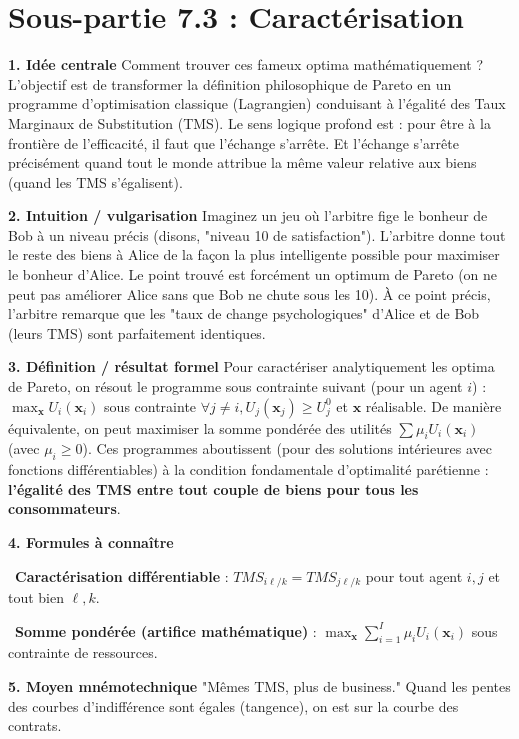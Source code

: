 \documentclass[11pt, a4paper]{report}
\begin{document}
\section{Sous-partie 7.3 : Caractérisation}

\textbf{1. Idée centrale}
Comment trouver ces fameux optima mathématiquement ? L'objectif est de transformer la définition philosophique de Pareto en un programme d'optimisation classique (Lagrangien) conduisant à l'égalité des Taux Marginaux de Substitution (TMS). Le sens logique profond est : pour être à la frontière de l'efficacité, il faut que l'échange s'arrête. Et l'échange s'arrête précisément quand tout le monde attribue la même valeur relative aux biens (quand les TMS s'égalisent).

\textbf{2. Intuition / vulgarisation}
Imaginez un jeu où l'arbitre fige le bonheur de Bob à un niveau précis (disons, "niveau 10 de satisfaction"). L'arbitre donne tout le reste des biens à Alice de la façon la plus intelligente possible pour maximiser le bonheur d'Alice. Le point trouvé est forcément un optimum de Pareto (on ne peut pas améliorer Alice sans que Bob ne chute sous les 10). À ce point précis, l'arbitre remarque que les "taux de change psychologiques" d'Alice et de Bob (leurs TMS) sont parfaitement identiques.

\textbf{3. Définition / résultat formel}
Pour caractériser analytiquement les optima de Pareto, on résout le programme sous contrainte suivant (pour un agent $i$) :
$\max_{\mathbf{x}} U_i(\mathbf{x}_i)$ sous contrainte $\forall j \neq i, U_j(\mathbf{x}_j) \ge U_j^0$ et $\mathbf{x}$ réalisable.
De manière équivalente, on peut maximiser la somme pondérée des utilités $\sum \mu_i U_i(\mathbf{x}_i)$ (avec $\mu_i \ge 0$).
Ces programmes aboutissent (pour des solutions intérieures avec fonctions différentiables) à la condition fondamentale d'optimalité parétienne : \textbf{l'égalité des TMS entre tout couple de biens pour tous les consommateurs}.

\textbf{4. Formules à connaître}
\par \textbullet\ \textbf{Caractérisation différentiable} : $TMS_{i \ell/k} = TMS_{j \ell/k}$ pour tout agent $i, j$ et tout bien $\ell, k$.
\par \textbullet\ \textbf{Somme pondérée (artifice mathématique)} : $\max_{\mathbf{x}} \sum_{i=1}^I \mu_i U_i(\mathbf{x}_i)$ sous contrainte de ressources.

\textbf{5. Moyen mnémotechnique}
"Mêmes TMS, plus de business." Quand les pentes des courbes d'indifférence sont égales (tangence), on est sur la courbe des contrats.
\end{document}
